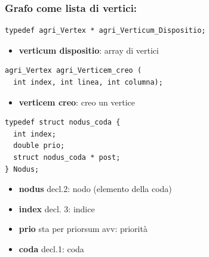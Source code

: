 \documentclass[8pt]{book}
\begin{document}
\subsubsection{Grafo come lista di vertici:}\label{graph-as-a-list-of-vertices}

\begin{spacing}{0.9}
  \begin{small}
    \begin{tcolorbox}
\begin{verbatim}
typedef agri_Vertex * agri_Verticum_Dispositio;
\end{verbatim}
  \end{tcolorbox}
    \end{small}
      \end{spacing}

\begin{itemize}

\item
  \textbf{verticum dispositio}: array di vertici
\end{itemize}

\begin{spacing}{0.9}
  \begin{small}
    \begin{tcolorbox}
\begin{verbatim}
agri_Vertex agri_Verticem_creo (
  int index, int linea, int columna);
\end{verbatim}
  \end{tcolorbox}
    \end{small}
      \end{spacing}

\begin{itemize}

\item
  \textbf{verticem creo}: creo un vertice
\end{itemize}

\begin{spacing}{0.9}
  \begin{small}
    \begin{tcolorbox}
\begin{verbatim}
typedef struct nodus_coda {
  int index;
  double prio;
  struct nodus_coda * post;
} Nodus;
\end{verbatim}
  \end{tcolorbox}
    \end{small}
      \end{spacing}

\begin{itemize}

\item
  \textbf{nodus} decl.2: nodo (elemento della coda)
\item
  \textbf{index} decl. 3: indice
\item
  \textbf{prio} sta per priorsum avv: priorità
\item
  \textbf{coda} decl.1: coda
\end{itemize}
\end{document}
